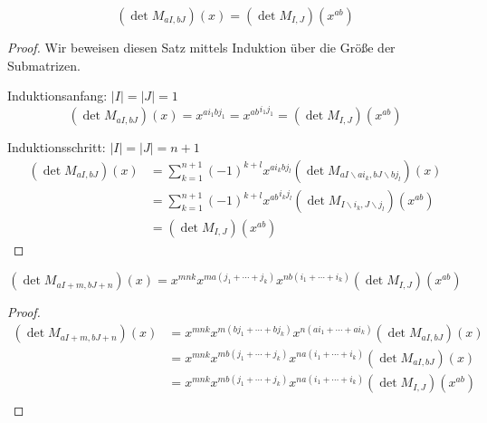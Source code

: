 \begin{satz}
    \begin{equation*}
        \left( \det{} M_{aI,bJ} \right) (x) = \left( \det{} M_{I,J} \right) (x^{ab})
    \end{equation*}
\end{satz}

\begin{proof}
    Wir beweisen diesen Satz mittels Induktion über die Größe der Submatrizen. 

    Induktionsanfang: $|I| = |J| = 1$
    \begin{equation*}
        \left( \det{} M_{aI,bJ} \right) (x) = x^{ai_1bj_1} = {x^{ab}}^{i_1j_1} = \left( \det{} M_{I,J} \right) (x^{ab})
    \end{equation*}

    Induktionsschritt: $|I| = |J| = n+1$
    \begin{align*}
        \left( \det{} M_{aI,bJ} \right) (x) &= \sum_{k=1}^{n+1} (-1)^{k+l} x^{ai_kbj_l} \left( \det M_{aI\backslash ai_k, bJ \backslash bj_l} \right) (x) \\
                                            &= \sum_{k=1}^{n+1} (-1)^{k+l} {x^{ab}}^{i_kj_l} \left( \det M_{I\backslash i_k, J \backslash j_l} \right) (x^{ab}) \\
                                            &= \left( \det{} M_{I,J} \right) (x^{ab})
    \end{align*}
\end{proof}

\begin{korollar}
    \begin{equation*}
        \left( \det{} M_{aI + m,bJ + n} \right) (x) = x^{mnk} x^{ma(j_1 +\cdots + j_k)} x^{nb(i_1+\cdots +i_k)} \left( \det{} M_{I,J} \right) (x^{ab})
    \end{equation*}
\end{korollar}

\begin{proof}
    \begin{align*}
        \left( \det{} M_{aI + m,bJ + n} \right) (x) &= x^{mnk} x^{m(bj_1 +\cdots + bj_k)} x^{n(ai_1+\cdots +ai_k)} \left( \det{} M_{aI,bJ} \right) (x) \\
                                                    &= x^{mnk} x^{mb(j_1 +\cdots + j_k)} x^{na(i_1+\cdots +i_k)} \left( \det{} M_{aI,bJ} \right) (x) \\
                                                    &= x^{mnk} x^{mb(j_1 +\cdots + j_k)} x^{na(i_1+\cdots +i_k)} \left( \det{} M_{I,J} \right) (x^{ab}) \\
    \end{align*}
\end{proof}